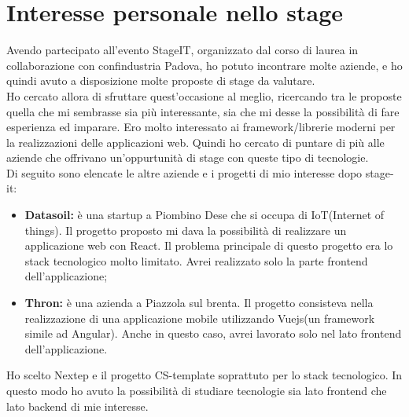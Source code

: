 \section{Interesse personale nello stage}

Avendo partecipato all’evento StageIT, organizzato dal corso di laurea in collaborazione
con confindustria Padova, ho potuto incontrare molte aziende, e ho quindi avuto a
disposizione molte proposte di stage da valutare.
\\

Ho cercato allora di sfruttare quest’occasione al meglio, ricercando tra le proposte
quella che mi sembrasse sia più interessante, sia che mi desse la possibilità di fare
esperienza ed imparare. Ero molto interessato ai framework/librerie moderni per la realizzazioni delle applicazioni web. Quindi ho cercato di puntare di più alle aziende che offrivano un'oppurtunità di stage con queste tipo di tecnologie. 
\\

Di seguito sono elencate le altre aziende e i  progetti di mio interesse dopo stage-it:
\begin{itemize}
	\item \textbf{Datasoil:} è una startup a Piombino Dese che si occupa di IoT(Internet of things). Il progetto proposto mi dava la possibilità di realizzare un applicazione web con React. Il problema principale di questo progetto era lo stack tecnologico molto limitato. Avrei realizzato solo la parte frontend dell'applicazione;
	\item \textbf{Thron:} è una azienda a Piazzola sul brenta. Il progetto consisteva nella realizzazione di una applicazione mobile utilizzando Vuejs(un framework simile ad Angular). Anche in questo caso, avrei lavorato solo nel lato frontend dell'applicazione. 
\end{itemize}
Ho scelto Nextep e il progetto CS-template soprattuto per lo stack tecnologico. In questo modo ho avuto la possibilità di studiare tecnologie sia lato frontend che lato backend di mie interesse. 
